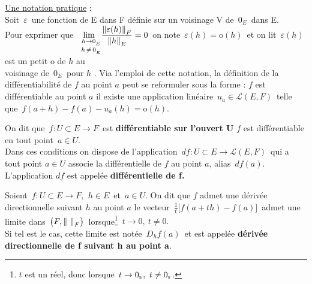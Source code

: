 \underline{Une notation pratique} : \vspace{0.2cm}\\
Soit $\,\varepsilon\,$ une fonction de E dans F définie sur un voisinage V de $\,0_E\,$ dans E.\vspace{0.1cm}\\
Pour exprimer que \(\displaystyle \lim_{\ \; \substack{\vspace{0.05cm}h\to 0_{_E} \\ h\,\neq\, 0_{_E}}}\!\frac{\norm{\varepsilon(h)}_F}{\norm{h}_E}=0\,\) on note \(\,\varepsilon(h)=\mathrm{o}(h)\,\) et on lit \guillemetleft $\,\varepsilon(h)$ est un petit o de $h$ au\vspace{0.3cm}\\
voisinage de $\,0_E\,$ pour $h\,$\guillemetright \,. Via l'emploi de cette notation, la définition de la différentiabilité de $f$ au point $a$ peut se reformuler sous la forme : $f$ est différentiable au point $a$ \ssi il existe une application linéaire \(\,u_a\in\mathscr{L}(E,F)\,\) telle que \(\,f(a+h)-f(a)-u_a(h)=\mathrm{o}(h).\)

\vspace{1.5cm}

On dit que \(\,f:U\!\subset\! E\to F\,\) est \textbf{différentiable sur l'ouvert U} \ssi $f$ est différentiable en tout point \(\,a\in U.\)\\
Dans ces conditions on dispose de l'application \(\,df:U\!\subset\! E\to \mathscr{L}(E,F)\,\) qui a tout point $a\in U$ associe la différentielle de $f$ au point $a$, alias \(\,df(a).\)\\
L'application $df$ est appelée \textbf{différentielle de f.}

\newpage

Soient \(\,f:U\subset E\to F,\ \, h\in E\,\) et \(\,a\in U.\) On dit que $f$ admet une dérivée directionnelle suivant $h$ au point $a$ \ssi le vecteur \(\,\displaystyle\frac{1}{t}\bigl[f(a+th)-f(a)\bigr]\,\) admet une limite dans \(\,\bigl(F,\norm{\ }_F\bigr)\,\) lorsque\footnote{$t$ est un réel, donc lorsque \(\,t\to 0_{_\RR},\ t\neq 0_{_\RR}\).} \(\,t\to 0,\ t\neq 0.\)\vspace{0.1cm}\\
Si tel est le cas, cette limite est notée \(\,D_hf(a)\,\) et est appelée \textbf{dérivée directionnelle de f suivant h au point a}.

\vspace{1cm}

